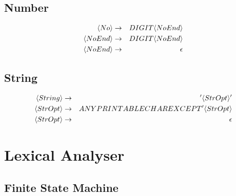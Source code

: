 \documentclass[a4paper,12pt]{article}
\newcommand{\nonterminal}[1]{\langle #1 \rangle}
\begin{document}
\subsection*{Number}
                            
\begin{eqnarray}
\setcounter{equation}{1}
\nonterminal{No} 			&	\to	&	 DIGIT \nonterminal{NoEnd}	\\
\nonterminal{NoEnd} 		&	\to	&	 DIGIT \nonterminal{NoEnd}	\\
\nonterminal{NoEnd} 		&	\to	&	 \epsilon
\end{eqnarray}

\subsection*{String}
                            
\begin{eqnarray}
\setcounter{equation}{1}
\nonterminal{String} 	&	\to	&	 ' \nonterminal{StrOpt} '	\\
\nonterminal{StrOpt} 	&	\to	&	 ANY PRINTABLE CHAR EXCEPT ' \nonterminal{StrOpt}	\\
\nonterminal{StrOpt} 	&	\to	&	 \epsilon
\end{eqnarray}

\section{Lexical Analyser}

\subsection*{Finite State Machine}
\end{document}

